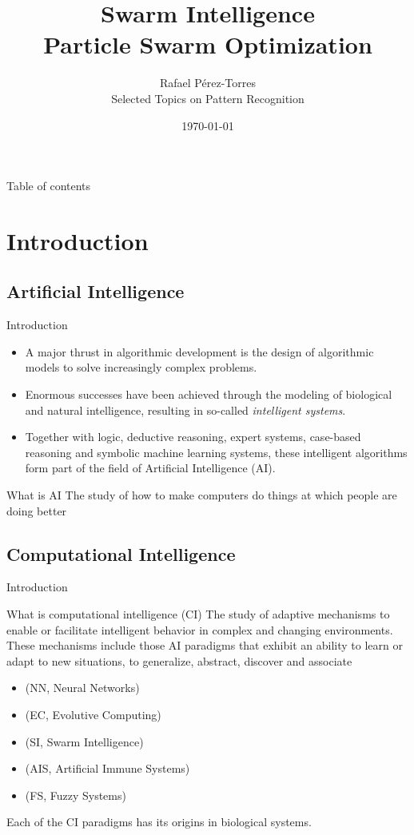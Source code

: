 \documentclass[aspectratio=169,compress,10pt]{beamer}
\author{Rafael Pérez-Torres \\ Selected Topics on Pattern Recognition}
\title{Swarm Intelligence \\ Particle Swarm Optimization}
\institute{Cinvestav Tamaulipas}
\date{\today}
\begin{document}
\frame{\maketitle}
\begin{frame}{Table of contents}
	\tableofcontents
\end{frame}

\section{Introduction}
\subsection{Artificial Intelligence}

\begin{frame}{Introduction}
\begin{itemize}
	\item A major thrust in algorithmic development is the design of algorithmic models to solve increasingly complex problems.
	\item Enormous successes have been achieved through the modeling of biological and natural intelligence, resulting in so-called \emph{intelligent systems}.
	\item Together with logic, deductive reasoning, expert systems, case-based reasoning and symbolic machine learning systems, these intelligent algorithms form part of the field of Artificial Intelligence (AI).
\end{itemize}

\begin{block}{What is AI}
The study of how to make computers do things at which people are doing better
\end{block}

\end{frame}

\subsection{Computational Intelligence}
\begin{frame}{Introduction}
\begin{block}{What is computational intelligence (CI)}
The study of adaptive mechanisms to enable or facilitate intelligent behavior in complex and changing environments.
These mechanisms include those AI paradigms that exhibit an ability to learn or adapt to new situations, to generalize, abstract, discover and associate
\end{block}
\begin{itemize}
	\item (NN, Neural Networks)
	\item (EC, Evolutive Computing)
	\item (SI, Swarm Intelligence)
	\item (AIS, Artificial Immune Systems)
	\item (FS, Fuzzy Systems)
\end{itemize}
Each of the CI paradigms has its origins in biological systems.
\end{frame}
\end{document}
